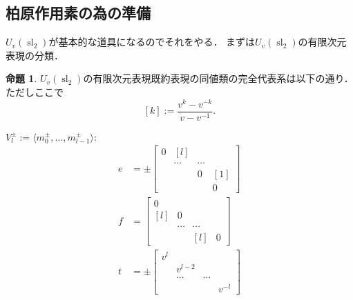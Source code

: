 \documentclass[dvipdfmx,autodetect-engine]{article}
\theoremstyle{definition}
\newtheorem{Prop}{命題}
\DeclareMathOperator{\sllie}{sl}
\begin{document}
\subsection{柏原作用素の為の準備}
    $U_{v}(\sllie_2)$が基本的な道具になるのでそれをやる．
    まずは$U_{v}(\sllie_2)$の有限次元表現の分類．
    
    \begin{Prop}
        $U_{v}(\sllie_2)$の有限次元表現既約表現の同値類の完全代表系は以下の通り．ただしここで
        \[
            [k] := \frac{v^{k} - v^{-k}}{v - v^{-1}}.
        \]
        
        $V_{l}^{\pm} 
        := \langle m_0^{\pm}, \dots, m_{l-1}^{\pm}\rangle$: 
        \begin{align*}
        e &= \pm
            \begin{bmatrix}
                0 & [l] & \\
                  &\cdots&\cdots&\\
                  &      & 0 & [1]\\
                  &      &   & 0 
            \end{bmatrix}\\
        f &= 
            \begin{bmatrix}
                0 &  & \\
                [l]  &0&&\\
                  & \cdots  & \cdots & \\
                  &      & [l]  & 0 
            \end{bmatrix}\\
        t &= \pm
            \begin{bmatrix}
                v^{l} &   \\
                  & v^{l-2}\\
                  & \cdots  & \cdots & \\
                  &     &   & v^{-l} 
            \end{bmatrix}
        \end{align*}
    \end{Prop}
\end{document}
